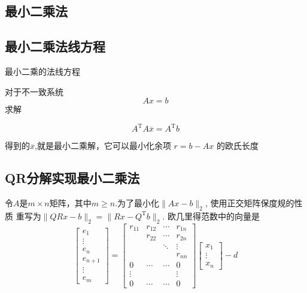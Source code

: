 \documentclass[UTF8,5pt,a4paper]{ctexart} %
\begin{document}
\begin{multicols}{4}
\section{最小二乘法}
\subsection{最小二乘法线方程}

最小二乘的法线方程

对于不一致系统
$$Ax=b$$
求解

\[
\boxed{A^{\mathrm{T}} A \overline{x} = A^{\mathrm{T}} b}
\]

得到的$\overline{x}$,就是最小二乘解，它可以最小化余项 $r=b-Ax$ 的欧氏长度
\subsection{QR分解实现最小二乘法}
令$A$是$m\times n$矩阵，其中$m\geqslant n.$为了最小化$\parallel Ax-b\parallel_2$,
使用正交矩阵保度规的性质 重写为$\parallel QRx-b\parallel_2=\parallel Rx-Q^{\mathrm{T}}b\parallel_2.$ 欧几里得范数中的向量是
\begin{equation*}
    \begin{bmatrix}
    e_1 \\
    \vdots \\
    e_n \\
    e_{n+1} \\
    \vdots \\
    e_m
    \end{bmatrix}
    =
    \begin{bmatrix}
    r_{11} & r_{12} & \cdots & r_{1n} \\
           & r_{22} & \cdots & r_{2n} \\
           &        & \ddots & \vdots \\
           &        &        & r_{nn} \\
    0      & \cdots & \cdots & 0 \\
    \vdots &        &        & \vdots \\
    0      & \cdots & \cdots & 0
    \end{bmatrix}
    \begin{bmatrix}
    x_1 \\
    \vdots \\
    x_n
    \end{bmatrix}
    -d
    \end{equation*}


\end{multicols}
\end{document}
